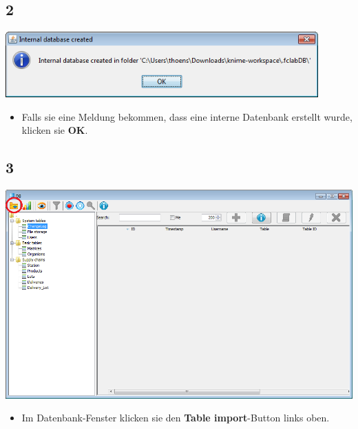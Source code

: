 \documentclass{beamer}
\begin{document}
\subsection{2}
\begin{frame}
	\begin{center}
  		\includegraphics[width=0.9\textwidth]{2.png}
	\end{center}
	\begin{itemize}
		\item Falls sie eine Meldung bekommen, dass eine interne Datenbank erstellt wurde, klicken sie \textbf{OK}.
	\end{itemize}
\end{frame}

\subsection{3}
\begin{frame}
	\begin{center}
  		\includegraphics[height=0.6\textheight]{3.png}
	\end{center}
	\begin{itemize}
		\item Im Datenbank-Fenster klicken sie den \textbf{Table import}-Button links oben.
	\end{itemize}
\end{frame}
\end{document}
